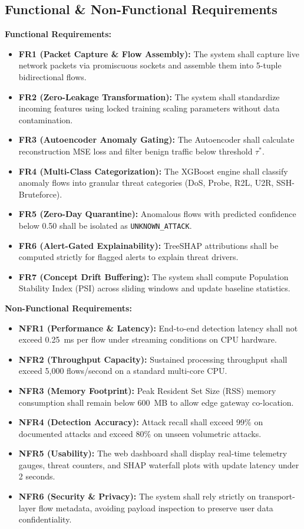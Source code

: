 \documentclass[12pt,a4paper]{report}
\begin{document}
\subsection{Functional \& Non-Functional Requirements}
\textbf{Functional Requirements:}
\begin{itemize}
    \item \textbf{FR1 (Packet Capture \& Flow Assembly):} The system shall capture live network packets via promiscuous sockets and assemble them into 5-tuple bidirectional flows.
    \item \textbf{FR2 (Zero-Leakage Transformation):} The system shall standardize incoming features using locked training scaling parameters without data contamination.
    \item \textbf{FR3 (Autoencoder Anomaly Gating):} The Autoencoder shall calculate reconstruction MSE loss and filter benign traffic below threshold $\tau^*$.
    \item \textbf{FR4 (Multi-Class Categorization):} The XGBoost engine shall classify anomaly flows into granular threat categories (DoS, Probe, R2L, U2R, SSH-Bruteforce).
    \item \textbf{FR5 (Zero-Day Quarantine):} Anomalous flows with predicted confidence below 0.50 shall be isolated as \texttt{UNKNOWN\_ATTACK}.
    \item \textbf{FR6 (Alert-Gated Explainability):} TreeSHAP attributions shall be computed strictly for flagged alerts to explain threat drivers.
    \item \textbf{FR7 (Concept Drift Buffering):} The system shall compute Population Stability Index (PSI) across sliding windows and update baseline statistics.
\end{itemize}

\textbf{Non-Functional Requirements:}
\begin{itemize}
    \item \textbf{NFR1 (Performance \& Latency):} End-to-end detection latency shall not exceed 0.25~ms per flow under streaming conditions on CPU hardware.
    \item \textbf{NFR2 (Throughput Capacity):} Sustained processing throughput shall exceed 5,000 flows/second on a standard multi-core CPU.
    \item \textbf{NFR3 (Memory Footprint):} Peak Resident Set Size (RSS) memory consumption shall remain below 600~MB to allow edge gateway co-location.
    \item \textbf{NFR4 (Detection Accuracy):} Attack recall shall exceed 99\% on documented attacks and exceed 80\% on unseen volumetric attacks.
    \item \textbf{NFR5 (Usability):} The web dashboard shall display real-time telemetry gauges, threat counters, and SHAP waterfall plots with update latency under 2 seconds.
    \item \textbf{NFR6 (Security \& Privacy):} The system shall rely strictly on transport-layer flow metadata, avoiding payload inspection to preserve user data confidentiality.
\end{itemize}
\end{document}
